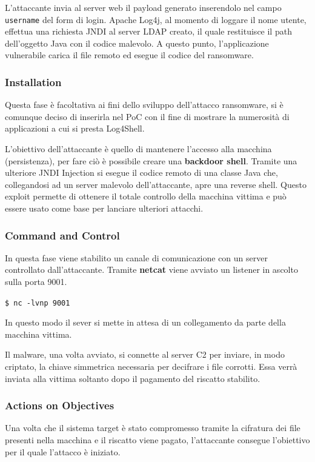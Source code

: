 \documentclass[a4paper, 12pt]{article}
\begin{document}
L'attaccante invia al server web il payload generato inserendolo nel campo \verb!username! del form di login.
Apache Log4j, al momento di loggare il nome utente, effettua una richiesta JNDI al server LDAP creato, il quale restituisce il path dell'oggetto Java con il codice malevolo.
A questo punto, l'applicazione vulnerabile carica il file remoto ed esegue il codice del ransomware.

\subsubsection{Installation}
Questa fase è facoltativa ai fini dello sviluppo dell'attacco ransomware, si è comunque deciso di inserirla nel PoC con il fine di mostrare la numerosità di applicazioni a cui si presta Log4Shell.

L’obiettivo dell'attaccante è quello di mantenere l’accesso alla macchina (persistenza), per fare ciò è possibile creare una \textbf{backdoor shell}.
Tramite una ulteriore JNDI Injection si esegue il codice remoto di una classe Java che, collegandosi ad un server malevolo dell'attaccante, apre una reverse shell.
Questo exploit permette di ottenere il totale controllo della macchina vittima e può essere usato come base per lanciare ulteriori attacchi.


\subsubsection{Command and Control}
In questa fase viene stabilito un canale di comunicazione con un server controllato dall’attaccante. 
Tramite \textbf{netcat} viene avviato un listener in ascolto sulla porta 9001.
\begin{center}
    \verb!$ nc -lvnp 9001!
\end{center}
In questo modo il sever si mette in attesa di un collegamento da parte della macchina vittima.

Il malware, una volta avviato, si connette al server C2 per inviare, in modo criptato, la chiave simmetrica necessaria per decifrare i file corrotti. Essa verrà inviata alla vittima soltanto dopo il pagamento del riscatto stabilito.


\subsubsection{Actions on Objectives}
Una volta che il sistema target è stato compromesso tramite la cifratura dei file presenti nella macchina e il riscatto viene pagato, l'attaccante consegue l’obiettivo per il quale l’attacco è iniziato.
\end{document}
